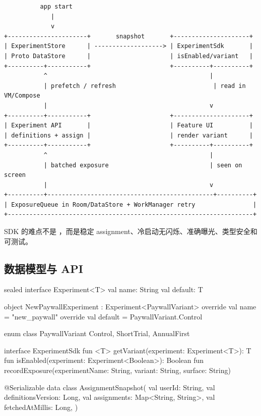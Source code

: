 \begin{lstlisting}
          app start
             |
             v
+----------------------+       snapshot       +---------------------+
| ExperimentStore      | -------------------> | ExperimentSdk       |
| Proto DataStore      |                      | isEnabled/variant   |
+----------+-----------+                      +----------+----------+
           ^                                             |
           | prefetch / refresh                           | read in VM/Compose
           |                                             v
+----------+-----------+                      +---------------------+
| Experiment API       |                      | Feature UI          |
| definitions + assign |                      | render variant      |
+----------+-----------+                      +----------+----------+
           ^                                             |
           | batched exposure                            | seen on screen
           |                                             v
+----------+----------------------------------------------+----------+
| ExposureQueue in Room/DataStore + WorkManager retry                |
+--------------------------------------------------------------------+
\end{lstlisting}

SDK 的难点不是 ，而是稳定 assignment、冷启动无闪烁、准确曝光、类型安全和可测试。

\subsection{数据模型与 API}

\begin{kotlin}
sealed interface Experiment<T> {
    val name: String
    val default: T
}

object NewPaywallExperiment : Experiment<PaywallVariant> {
    override val name = "new_paywall"
    override val default = PaywallVariant.Control
}

enum class PaywallVariant { Control, ShortTrial, AnnualFirst }

interface ExperimentSdk {
    fun <T> getVariant(experiment: Experiment<T>): T
    fun isEnabled(experiment: Experiment<Boolean>): Boolean
    fun recordExposure(experimentName: String, variant: String, surface: String)
}

@Serializable
data class AssignmentSnapshot(
    val userId: String,
    val definitionsVersion: Long,
    val assignments: Map<String, String>,
    val fetchedAtMillis: Long,
)
\end{kotlin}

